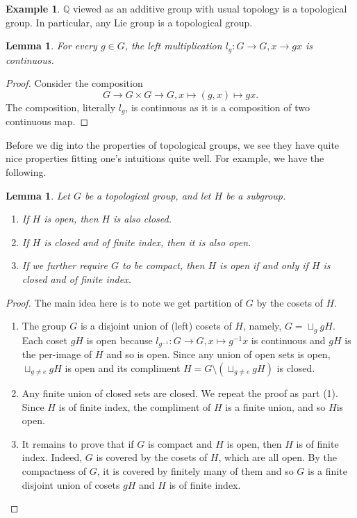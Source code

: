 \documentclass[12pt]{report}
\newtheorem{lemma}[theorem]{Lemma}
\theoremstyle{definition}
\newtheorem{example}[theorem]{Example}
\newcommand{\qq}{\mathbb{Q}}
\begin{document}
\begin{example}
	$\qq$ viewed as an additive group with usual topology is a topological group.
	In particular, any Lie group is a topological group.
\end{example}

\begin{lemma}
	For every $g\in G$, the left multiplication $l_g: G\to G, x\to gx$ is continuous.
\end{lemma}

\begin{proof}
	Consider the composition $$G\to G\times G \to G, x\mapsto (g,x)\mapsto gx.$$
	The composition, literally $l_g$, is continuous as it is a composition of two continuous map.
\end{proof}

Before we dig into the properties of topological groups, we see they have quite nice properties fitting one's intuitions quite well. For example, we have the following.

\begin{lemma}
	Let $G$ be a topological group, and let $H$ be a subgroup.
	\begin{enumerate}
		\item If $H$ is open, then $H$ is also closed.
		\item If $H$ is closed and of finite index, then it is also open.
		\item If we further require $G$ to be compact, then $H$ is open if and only if $H$ is closed and of finite index.
	\end{enumerate}
\end{lemma}
\begin{proof}
	The main idea here is to note we get partition of $G$ by the cosets of $H$.
	\begin{enumerate}
		\item The group $G$ is a disjoint union of (left) cosets of $H$, namely, $G=\sqcup_{g} gH$. Each coset $gH$ is open because $l_{g^{-1}}: G\to G, x\mapsto g^{-1}x$ is continuous and $gH$ is the per-image of $H$ and so is open. Since any union of open sets is open, $\sqcup_{g\not= e}gH$ is open and its compliment $H=G\setminus (\sqcup_{g\not= e}gH)$ is closed.
		\item Any finite union of closed sets are closed. We repeat the proof as part (1). Since $H$ is of finite index, the compliment of $H$ is a finite union, and so $H$is  open.
		\item It remains to prove that if $G$ is compact and $H$ is open, then $H$ is of finite index. Indeed, $G$ is covered by the cosets of $H$, which are all open. By the compactness of $G$, it is covered by finitely many of them and so $G$ is a finite disjoint union of cosets $gH$ and $H$ is of finite index.
	\end{enumerate}
\end{proof}
\end{document}
